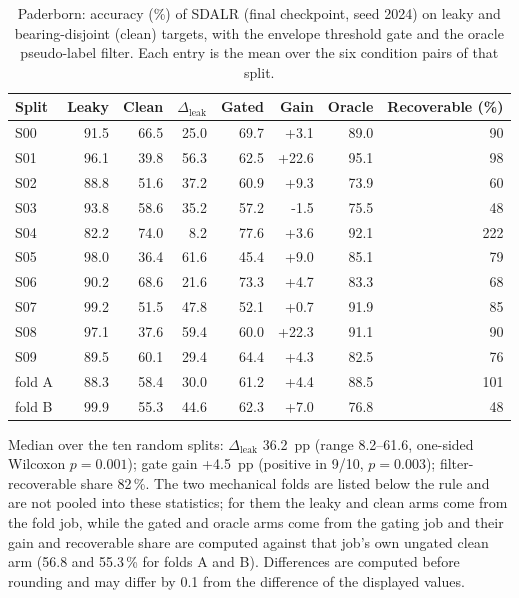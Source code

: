 \begin{table}[htbp]
\centering
\caption{Paderborn: accuracy (\%) of SDALR (final checkpoint, seed 2024) on leaky and bearing-disjoint (clean) targets, with the envelope threshold gate and the oracle pseudo-label filter. Each entry is the mean over the six condition pairs of that split.}
\label{tab:collapse}
\small
\setlength{\tabcolsep}{4pt}
\begin{tabular}{lrrrrrrr}
\toprule
Split & Leaky & Clean & $\Delta_{\mathrm{leak}}$ & Gated & Gain & Oracle & Recoverable (\%) \\
\midrule
S00 & 91.5 & 66.5 & 25.0 & 69.7 & +3.1 & 89.0 & 90 \\
S01 & 96.1 & 39.8 & 56.3 & 62.5 & +22.6 & 95.1 & 98 \\
S02 & 88.8 & 51.6 & 37.2 & 60.9 & +9.3 & 73.9 & 60 \\
S03 & 93.8 & 58.6 & 35.2 & 57.2 & -1.5 & 75.5 & 48 \\
S04 & 82.2 & 74.0 & 8.2 & 77.6 & +3.6 & 92.1 & 222 \\
S05 & 98.0 & 36.4 & 61.6 & 45.4 & +9.0 & 85.1 & 79 \\
S06 & 90.2 & 68.6 & 21.6 & 73.3 & +4.7 & 83.3 & 68 \\
S07 & 99.2 & 51.5 & 47.8 & 52.1 & +0.7 & 91.9 & 85 \\
S08 & 97.1 & 37.6 & 59.4 & 60.0 & +22.3 & 91.1 & 90 \\
S09 & 89.5 & 60.1 & 29.4 & 64.4 & +4.3 & 82.5 & 76 \\
\midrule
fold A & 88.3 & 58.4 & 30.0 & 61.2 & +4.4 & 88.5 & 101 \\
fold B & 99.9 & 55.3 & 44.6 & 62.3 & +7.0 & 76.8 & 48 \\
\bottomrule
\end{tabular}
\begin{minipage}{\linewidth}\vspace{2pt}\footnotesize Median over the ten random splits: $\Delta_{\mathrm{leak}}$ 36.2~pp (range 8.2--61.6, one-sided Wilcoxon $p=0.001$); gate gain +4.5~pp (positive in 9/10, $p=0.003$); filter-recoverable share 82\,\%. The two mechanical folds are listed below the rule and are not pooled into these statistics; for them the leaky and clean arms come from the fold job, while the gated and oracle arms come from the gating job and their gain and recoverable share are computed against that job's own ungated clean arm (56.8 and 55.3\,\% for folds A and B). Differences are computed before rounding and may differ by 0.1 from the difference of the displayed values.\end{minipage}
\end{table}
